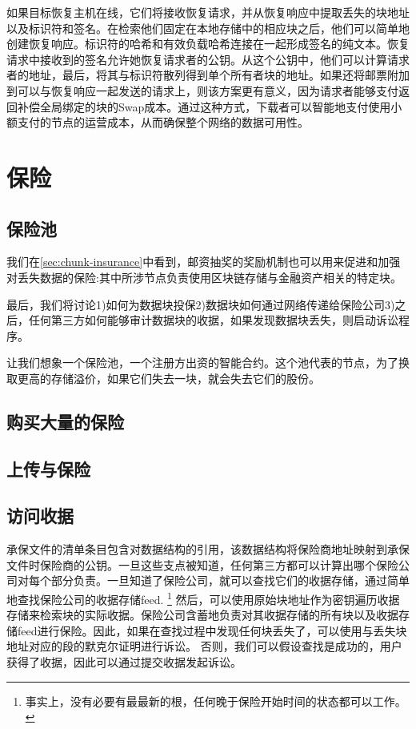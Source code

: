 如果目标恢复主机在线，它们将接收恢复请求，并从恢复响应中提取丢失的块地址以及标识符和签名。在检索他们固定在本地存储中的相应块之后，他们可以简单地创建恢复响应。标识符的哈希和有效负载哈希连接在一起形成签名的纯文本。恢复请求中接收到的签名允许她恢复请求者的公钥。从这个公钥中，他们可以计算请求者的地址，最后，将其与标识符散列得到单个所有者块的地址。如果还将邮票附加到可以与恢复响应一起发送的请求上，则该方案更有意义，因为请求者能够支付返回补偿全局绑定的块的Swap成本。通过这种方式，下载者可以智能地支付使用小额支付的节点的运营成本，从而确保整个网络的数据可用性。



\section{保险\statusorange}\label{sec:insurance}
 

\subsection{保险池\statusorange}
我们在\ref{sec:chunk-insurance}中看到，邮资抽奖的奖励机制也可以用来促进和加强对丢失数据的保险:其中所涉节点负责使用区块链存储与金融资产相关的特定块。 

最后，我们将讨论1)如何为数据块投保2)数据块如何通过网络传递给保险公司3)之后，任何第三方如何能够审计数据块的收据，如果发现数据块丢失，则启动诉讼程序。

让我们想象一个保险池，一个注册方出资的智能合约。这个池代表的节点，为了换取更高的存储溢价，如果它们失去一块，就会失去它们的股份。 

\subsection{购买大量的保险}

\subsection{上传与保险\statusred}


\subsection{访问收据\statusred}

承保文件的清单条目包含对数据结构的引用，该数据结构将保险商地址映射到承保文件时保险商的公钥。一旦这些支点被知道，任何第三方都可以计算出哪个保险公司对每个部分负责。一旦知道了保险公司，就可以查找它们的收据存储，通过简单地查找保险公司的收据存储feed.%
%
\footnote{事实上，没有必要有最最新的根，任何晚于保险开始时间的状态都可以工作。}
%
然后，可以使用原始块地址作为密钥遍历收据存储来检索块的实际收据。保险公司含蓄地负责对其收据存储的所有块以及收据存储feed进行保险。因此，如果在查找过程中发现任何块丢失了，可以使用与丢失块地址对应的段的默克尔证明进行诉讼。 
否则，我们可以假设查找是成功的，用户获得了收据，因此可以通过提交收据发起诉讼。 


